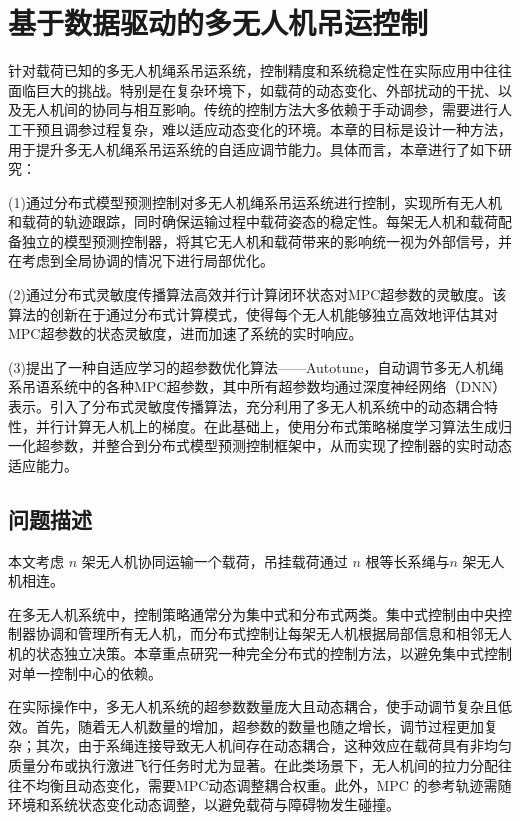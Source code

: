 \documentclass[lang=chs, degree=master, blindreview=false, winfonts=true]{yanputhesis}
\begin{document}
\cleardoublepage

\chapter{基于数据驱动的多无人机吊运控制}
针对载荷已知的多无人机绳系吊运系统，控制精度和系统稳定性在实际应用中往往面临巨大的挑战。特别是在复杂环境下，如载荷的动态变化、外部扰动的干扰、以及无人机间的协同与相互影响。传统的控制方法大多依赖于手动调参，需要进行人工干预且调参过程复杂，难以适应动态变化的环境。本章的目标是设计一种方法，用于提升多无人机绳系吊运系统的自适应调节能力。具体而言，本章进行了如下研究：

(1)通过分布式模型预测控制对多无人机绳系吊运系统进行控制，实现所有无人机和载荷的轨迹跟踪，同时确保运输过程中载荷姿态的稳定性。每架无人机和载荷配备独立的模型预测控制器，将其它无人机和载荷带来的影响统一视为外部信号，并在考虑到全局协调的情况下进行局部优化。

(2)通过分布式灵敏度传播算法高效并行计算闭环状态对MPC超参数的灵敏度。该算法的创新在于通过分布式计算模式，使得每个无人机能够独立高效地评估其对MPC超参数的状态灵敏度，进而加速了系统的实时响应。

(3)提出了一种自适应学习的超参数优化算法——Autotune，自动调节多无人机绳系吊语系统中的各种MPC超参数，其中所有超参数均通过深度神经网络（DNN）表示。引入了分布式灵敏度传播算法，充分利用了多无人机系统中的动态耦合特性，并行计算无人机上的梯度。在此基础上，使用分布式策略梯度学习算法生成归一化超参数，并整合到分布式模型预测控制框架中，从而实现了控制器的实时动态适应能力。

\section{问题描述}
本文考虑 $n$ 架无人机协同运输一个载荷，吊挂载荷通过 $n$ 根等长系绳与$n$ 架无人机相连。

在多无人机系统中，控制策略通常分为集中式和分布式两类。集中式控制由中央控制器协调和管理所有无人机，而分布式控制让每架无人机根据局部信息和相邻无人机的状态独立决策。本章重点研究一种完全分布式的控制方法，以避免集中式控制对单一控制中心的依赖。

在实际操作中，多无人机系统的超参数数量庞大且动态耦合，使手动调节复杂且低效。首先，随着无人机数量的增加，超参数的数量也随之增长，调节过程更加复杂；其次，由于系绳连接导致无人机间存在动态耦合，这种效应在载荷具有非均匀质量分布或执行激进飞行任务时尤为显著。在此类场景下，无人机间的拉力分配往往不均衡且动态变化，需要MPC动态调整耦合权重。此外，MPC 的参考轨迹需随环境和系统状态变化动态调整，以避免载荷与障碍物发生碰撞。
\end{document}
